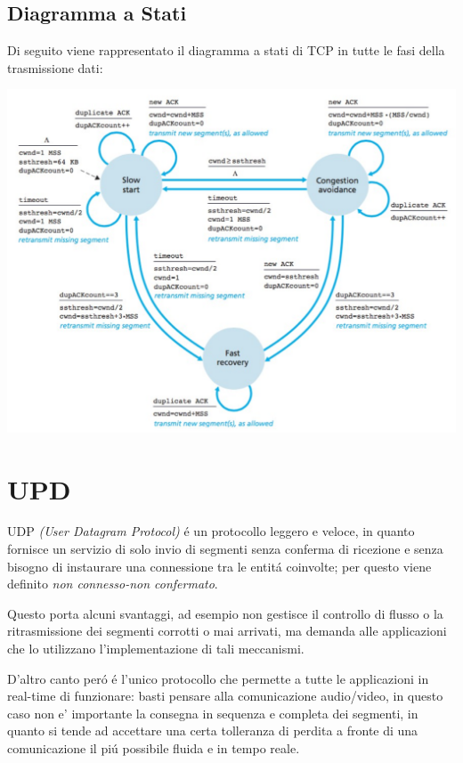 \documentclass[12pt]{article}
\begin{document}
\subsection{Diagramma a Stati}\label{tcp-diagramma-a-stati}
Di seguito viene rappresentato il diagramma a stati di TCP in tutte le fasi della trasmissione dati:
\begin{center}
	\includegraphics[scale=0.41]{livello_trasporto-img20.png}
\end{center}



\clearpage
\section{UPD}\label{udp}
UDP \textit{(User Datagram Protocol)} \'e un protocollo leggero e veloce, in quanto fornisce un servizio di solo 
invio di segmenti senza conferma di ricezione e senza bisogno di instaurare una connessione tra le entit\'a 
coinvolte; per questo viene definito \textit{non connesso-non confermato}.

Questo porta alcuni svantaggi, ad esempio non gestisce il controllo di flusso o la ritrasmissione dei segmenti 
corrotti o mai arrivati, ma demanda alle applicazioni che lo utilizzano l'implementazione di tali meccanismi.

D'altro canto per\'o \'e l'unico protocollo che permette a tutte le applicazioni in real-time di funzionare: basti 
pensare alla comunicazione audio/video, in questo caso non e' importante la consegna in sequenza e completa dei 
segmenti, in quanto si tende ad accettare una certa tolleranza di perdita a fronte di una comunicazione il pi\'u 
possibile fluida e in tempo reale.
\end{document}
